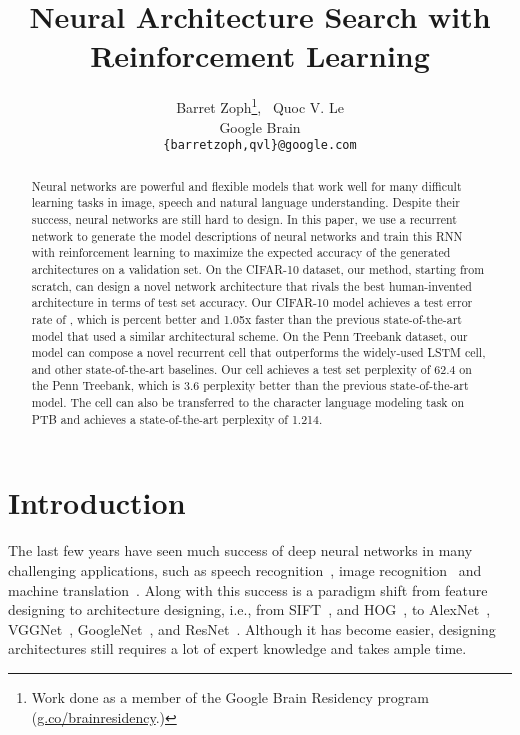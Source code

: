 \documentclass{article} \usepackage{iclr2017_conference,times}
\title{Neural Architecture Search with\\Reinforcement Learning}
\author{Barret Zoph\thanks{Work done as a member of the Google Brain Residency program (\url{g.co/brainresidency}.)}, ~Quoc V. Le \\
Google Brain \\
\texttt{\{barretzoph,qvl\}@google.com} \\
}
\begin{document}
\maketitle

\begin{abstract}
Neural networks are powerful and flexible models that work well for many difficult learning tasks in image, speech and natural language understanding. Despite their success, neural networks are still hard to design.
In this paper, we
use a recurrent network to generate the model descriptions of neural networks and train this RNN with reinforcement learning to maximize the expected accuracy of the generated architectures on a validation set. 
On the CIFAR-10 dataset, our method, starting from scratch, can design a novel network architecture that rivals the best human-invented architecture in terms of test set accuracy. Our CIFAR-10 model achieves a test error rate of , which is  percent better and 1.05x faster than the previous state-of-the-art model that used a similar architectural scheme. On the Penn Treebank dataset, our model can compose a novel recurrent cell that outperforms the widely-used LSTM cell, and other state-of-the-art baselines.  Our cell achieves a test set perplexity of 62.4 on the Penn Treebank, which is 3.6 perplexity better than the previous state-of-the-art model. The cell can also be transferred to the character language modeling task on PTB and achieves a state-of-the-art perplexity of 1.214.




\end{abstract}

\section{Introduction}
The last few years have seen much success of deep neural networks in many challenging applications, such as speech recognition~\citep{hinton2012deep}, image recognition~\citep{lecun1998gradient,krizhevsky2012imagenet} and machine translation~\citep{sutskever2014sequence,bahdanau2014neural,wu2016google}. Along with this success is a paradigm shift from feature designing to architecture designing, i.e., from SIFT~\citep{lowe1999object}, and HOG~\citep{dalal2005histograms}, to AlexNet~\citep{krizhevsky2012imagenet}, VGGNet~\citep{simonyan2014very}, GoogleNet~\citep{szegedy2015going}, and ResNet~\citep{he2015deep}. Although it has become easier, designing architectures still requires a lot of expert knowledge and takes ample time. 
\end{document}
